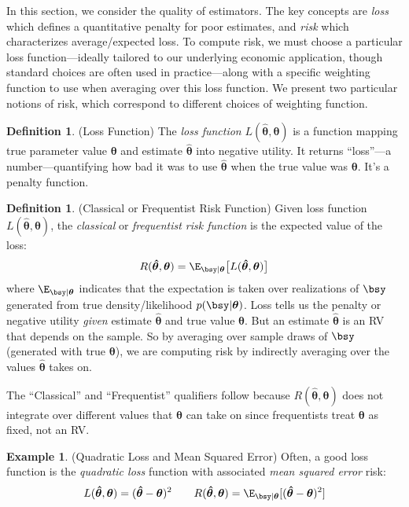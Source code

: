 \documentclass[12pt]{article}
\theoremstyle{plain}
\theoremstyle{definition}
\newtheorem{defn}[thm]{Definition}
\newtheorem{ex}[thm]{Example}
\theoremstyle{remark}
\newcommand{\bstheta}{\boldsymbol{\theta}}
\newcommand{\bshattheta}{\boldsymbol{\hat{\theta}}}
\begin{document}
In this section, we consider the quality of estimators. The key
concepts are \emph{loss} which defines a quantitative penalty for poor
estimates, and \emph{risk} which characterizes average/expected loss.
To compute risk, we must choose a particular loss function---ideally
tailored to our underlying economic application, though standard choices
are often used in practice---along with a specific weighting function to
use when averaging over this loss function. We present two particular
notions of risk, which correspond to different choices of weighting
function.

\begin{defn}(Loss Function)
The \emph{loss function} $L(\bshattheta,\bstheta)$ is a function mapping
true parameter value $\bstheta$ and estimate $\bshattheta$ into negative
utility. It returns ``loss''---a number---quantifying how bad it was to
use $\bshattheta$ when the true value was $\bstheta$. It's a penalty
function.
\end{defn}

\begin{defn}{(Classical or Frequentist Risk Function)}
Given loss function $L(\bshattheta,\bstheta)$, the \emph{classical} or
\emph{frequentist risk function} is the expected value of the loss:
\begin{align*}
  R(\bshattheta,\bstheta)
  = \E_{\bsy|\bstheta}\big[L(\bshattheta,\bstheta)\big]
\end{align*}
where $\E_{\bsy|\bstheta}$ indicates that the expectation is taken over
realizations of $\bsy$ generated from true density/likelihood
$p(\bsy|\bstheta)$.
Loss tells us the penalty or negative utility \emph{given} estimate
$\bshattheta$ and true value $\bstheta$. But an estimate $\bshattheta$
is an RV that depends on the sample.
So by averaging over sample draws of $\bsy$ (generated with true
$\bstheta$), we are computing risk by indirectly averaging over the
values $\bshattheta$ takes on.

The ``Classical'' and ``Frequentist'' qualifiers follow because
$R(\bshattheta,\bstheta)$ does not integrate over different values that
$\bstheta$ can take on since frequentists treat $\bstheta$ as fixed, not
an RV.
\end{defn}

\begin{ex}(Quadratic Loss and Mean Squared Error)
Often, a good loss function is the \emph{quadratic loss} function
with associated \emph{mean squared error} risk:
\begin{align*}
  L(\bshattheta,\bstheta) = (\bshattheta-\bstheta)^2
  \qquad
  R(\bshattheta,\bstheta)
  = \E_{\bsy|\bstheta}[(\bshattheta-\bstheta)^2]
\end{align*}
\end{ex}
\end{document}
